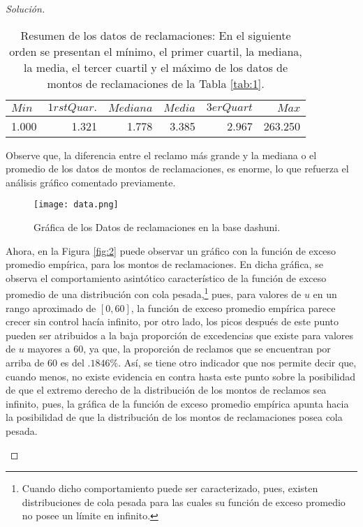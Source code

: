 \documentclass[10.5pt,notitlepage]{article}
\newenvironment{solucion}
  {\begin{proof}[Solución]}
  {\end{proof}}
\theoremstyle{plain}
\begin{document}
\begin{solucion}
\begin{table}[H]
        \centering
        \begin{tabular}{@{}l@{\hskip 0.3in}r@{\hskip 0.3in}r@{\hskip 0.3in}r@{\hskip 0.3in}r@{\hskip 0.3in}r@{}}
        \toprule
        \(Min\)&  \(1rst Quar.\)&  \(Mediana\)&  \(Media\)&  \(3er Quart\)& \(Max\)\\ 
        \midrule            
          1.000 & 1.321&   1.778&  3.385&   2.967& 263.250\\
        \end{tabular} 
        \caption{Resumen de los datos de reclamaciones: En el siguiente orden se presentan el mínimo, el primer cuartil, la mediana, la media, el tercer cuartil y el máximo de los datos de montos de reclamaciones de la Tabla \ref{tab:1}.}
        \label{tab:2}
\end{table}
Observe que, la diferencia entre el reclamo más grande y la mediana o el promedio de los datos de montos de reclamaciones, es enorme, lo que refuerza el análisis gráfico comentado previamente.
\begin{figure}[htb]
    \centering
    \texttt{[image: data.png]}
    \caption{Gráfica de los Datos de reclamaciones en la base dashuni.}
    \label{fig:1}
\end{figure}
Ahora, en la Figura \ref{fig:2} puede observar un gráfico con la función de exceso promedio empírica, para los montos de reclamaciones. En dicha gráfica, se observa el comportamiento asintótico característico de la función de exceso promedio de una distribución con cola pesada,\footnote{Cuando dicho comportamiento puede ser caracterizado, pues, existen distribuciones de cola pesada para las cuales su función de exceso promedio no posee un límite en infinito.} pues, para valores de \(u\) en un rango aproximado de \([0,60]\), la función de exceso promedio empírica parece crecer sin control hacía infinito, por otro lado, los picos después de este punto pueden ser atribuidos a la baja proporción de excedencias que existe para valores de \(u\) mayores a \(60\), ya que, la proporción de reclamos que se encuentran por arriba de \(60\) es del \(.1846\%\). Así, se tiene otro indicador que nos permite decir que, cuando menos, no existe evidencia en contra hasta este punto sobre la posibilidad de que el extremo derecho de la distribución de los montos de reclamos sea infinito, pues, la gráfica de la función de exceso promedio empírica apunta hacia la posibilidad de que la distribución de los montos de reclamaciones posea cola pesada.  
\begin{figure}[htb]

\end{figure}
\end{solucion}
\end{document}
